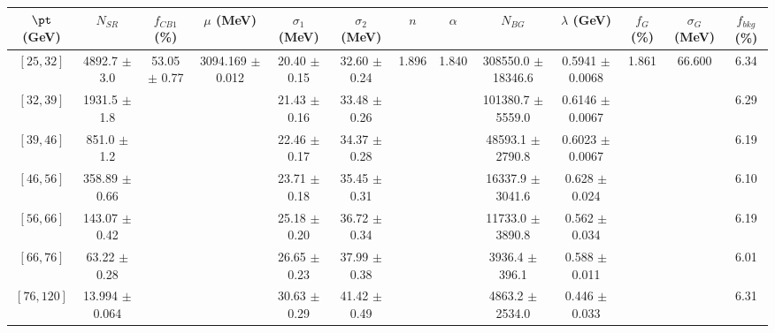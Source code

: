 \begin{tabular}{c||c|c|c|c|c|c|c|c|c|c|c||c}
$\pt$ (GeV) & $N_{SR}$ & $f_{CB1}$ (\%) & $\mu$ (MeV) & $\sigma_1$ (MeV) & $\sigma_2$ (MeV) & $n$ & $\alpha$ & $N_{BG}$ & $\lambda$ (GeV) & $f_G$ (\%) & $\sigma_G$ (MeV) & $f_{bkg}$ (\%) \\
\hline
$[25, 32]$ & 4892.7 $\pm$ 3.0 & \multirow{7}{*}{53.05 $\pm$ 0.77} & \multirow{7}{*}{3094.169 $\pm$ 0.012} & 20.40 $\pm$ 0.15 & 32.60 $\pm$ 0.24 & \multirow{7}{*}{1.896} & \multirow{7}{*}{1.840} & 308550.0 $\pm$ 18346.6 & 0.5941 $\pm$ 0.0068 & \multirow{7}{*}{1.861} & \multirow{7}{*}{66.600} & 6.34\\
$[32, 39]$ & 1931.5 $\pm$ 1.8 &  &  & 21.43 $\pm$ 0.16 & 33.48 $\pm$ 0.26 &  &  & 101380.7 $\pm$ 5559.0 & 0.6146 $\pm$ 0.0067 &  &  & 6.29\\
$[39, 46]$ & 851.0 $\pm$ 1.2 &  &  & 22.46 $\pm$ 0.17 & 34.37 $\pm$ 0.28 &  &  & 48593.1 $\pm$ 2790.8 & 0.6023 $\pm$ 0.0067 &  &  & 6.19\\
$[46, 56]$ & 358.89 $\pm$ 0.66 &  &  & 23.71 $\pm$ 0.18 & 35.45 $\pm$ 0.31 &  &  & 16337.9 $\pm$ 3041.6 & 0.628 $\pm$ 0.024 &  &  & 6.10\\
$[56, 66]$ & 143.07 $\pm$ 0.42 &  &  & 25.18 $\pm$ 0.20 & 36.72 $\pm$ 0.34 &  &  & 11733.0 $\pm$ 3890.8 & 0.562 $\pm$ 0.034 &  &  & 6.19\\
$[66, 76]$ & 63.22 $\pm$ 0.28 &  &  & 26.65 $\pm$ 0.23 & 37.99 $\pm$ 0.38 &  &  & 3936.4 $\pm$ 396.1 & 0.588 $\pm$ 0.011 &  &  & 6.01\\
$[76, 120]$ & 13.994 $\pm$ 0.064 &  &  & 30.63 $\pm$ 0.29 & 41.42 $\pm$ 0.49 &  &  & 4863.2 $\pm$ 2534.0 & 0.446 $\pm$ 0.033 &  &  & 6.31\\
\end{tabular}
